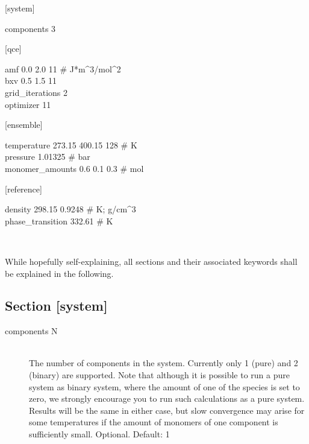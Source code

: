 \documentclass{scrartcl}
\begin{document}
\begin{addmargin}[1cm]{0cm}
    \ttfamily
    \begin{minipage}{\textwidth}
        [system]
        \begin{addmargin}[1cm]{0cm}
            components 3
        \end{addmargin}
    \end{minipage}

    \begin{minipage}{\textwidth}
        [qce]
        \begin{addmargin}[1cm]{0cm}
            amf 0.0 2.0 11 \# J*m\^{}3/mol\^{}2 \\
            bxv 0.5 1.5 11 \\
            grid\_iterations 2 \\
            optimizer 11
        \end{addmargin}
    \end{minipage}

    \begin{minipage}{\textwidth}
        [ensemble]
        \begin{addmargin}[1cm]{0cm}
            temperature 273.15 400.15 128 \# K \\
            pressure 1.01325 \# bar \\
            monomer\_amounts 0.6 0.1 0.3 \# mol
        \end{addmargin}
    \end{minipage}

    \begin{minipage}{\textwidth}
        [reference]
        \begin{addmargin}[1cm]{0cm}
            density 298.15 0.9248 \# K; g/cm\^{}3 \\
            phase\_transition 332.61 \# K
        \end{addmargin}
    \end{minipage}
\end{addmargin}

\

While hopefully self-explaining, all sections and their associated keywords shall be explained in the following.

\subsection{Section [system]}

\begin{description}
    \item[components N] \hfill \\
        The number of components in the system.
        Currently only 1 (pure) and 2 (binary) are supported.
        Note that although it is possible to run a pure system as binary system, where the amount of one of the species is set to zero, we strongly encourage you to run such calculations as a pure system.
        Results will be the same in either case, but slow convergence may arise for some temperatures if the amount of monomers of one component is sufficiently small.
        Optional. Default: 1
\end{description}
\end{document}
